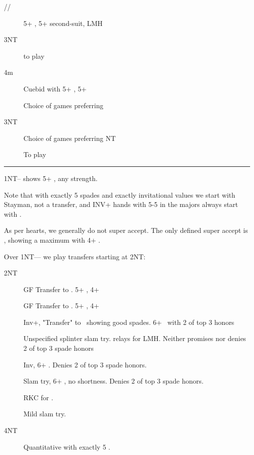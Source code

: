 \documentclass[tom-ari]{subfiles}
\begin{document}
\begin{description}
  \item[//] 5+ \heartsuit, 5+ second-suit, LMH
  \item[3NT] to play
  \item[4m] Cuebid with 5+ \heartsuit, 5+ \spadesuit
\end{description}

\begin{description}
  \item[] Choice of games preferring \heartsuit
  \item[3NT] Choice of games preferring NT
  \item[] To play
\end{description}

\noindent\rule{\textwidth}{1pt}


1NT-- shows 5+ \spadesuit, any strength.

Note that with exactly 5 spades and exactly invitational values we start with Stayman, not a transfer, and INV+ hands with 5-5 in the majors always start with .

As per hearts, we generally do not super accept. The only defined super accept is , showing a maximum with 4+ \spadesuit.

Over 1NT---- we play transfers starting at 2NT:

\begin{description}
  \item[2NT] GF Transfer to \clubsuit. 5+ \spadesuit, 4+ \clubsuit
  \item[] GF Transfer to \diamondsuit. 5+ \spadesuit, 4+ \diamondsuit
  \item[] Inv+, "Transfer" to \spadesuit ~showing good spades. 6+ \spadesuit ~with 2 of top 3 honors
  \item[] Unspecified splinter slam try.  relays for LMH. Neither promises nor denies 2 of top 3 spade honors
  \item[] Inv, 6+ \spadesuit. Denies 2 of top 3 spade honors.
  \item[] Slam try, 6+ \spadesuit, no shortness. Denies 2 of top 3 spade honors.
  \item[] RKC for \spadesuit.
  \item[] Mild slam try.
  \item[4NT] Quantitative with exactly 5 \spadesuit.
\end{description}
\end{document}
